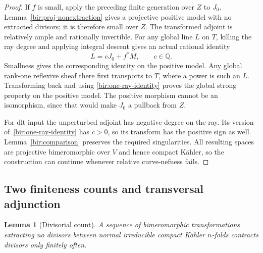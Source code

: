 \documentclass[11pt,letterpaper]{article}
\newcommand{\Q}{\mathbb{Q}}
\newtheorem{lemma}[theorem]{Lemma}
\theoremstyle{definition}
\theoremstyle{remark}
\begin{document}
\begin{proof}
If $f$ is small, apply the preceding finite generation over $Z$ to
$J_0$.  Lemma~\ref{bir:proj-nonextraction} gives a projective positive
model with no extracted divisors; it is therefore small over $Z$.
The transformed adjoint is relatively ample and rationally invertible.
For any global line $L$ on $T$, killing the ray degree and applying
integral descent gives an actual rational identity
\begin{equation}
 L=cJ_0+f^*M,\qquad c\in\Q.
 \label{bir:one-ray-identity}
\end{equation}
Smallness gives the corresponding identity on the positive model.
Any global rank-one reflexive sheaf there first transports to $T$,
where a power is such an $L$.  Transforming back and using
\eqref{bir:one-ray-identity} proves the global strong property on the
positive model.  The positive morphism cannot be an isomorphism,
since that would make $J_0$ a pullback from $Z$.

For dlt input the unperturbed adjoint has negative degree on the ray.
Its version of~\eqref{bir:one-ray-identity} has $c>0$, so its transform
has the positive sign as well.  Lemma~\ref{bir:comparison} preserves
the required singularities.  All resulting spaces are projective
bimeromorphic over $V$ and hence compact K\"ahler, so the construction
can continue whenever relative curve-nefness fails.
\end{proof}

\subsection{Two finiteness counts and transversal adjunction}
\label{bir:counts}

\begin{lemma}[Divisorial count]
\label{bir:cycle-count}
A sequence of bimeromorphic transformations extracting no divisors
between normal irreducible compact K\"ahler $n$-folds contracts
divisors only finitely often.
\end{lemma}
\end{document}
